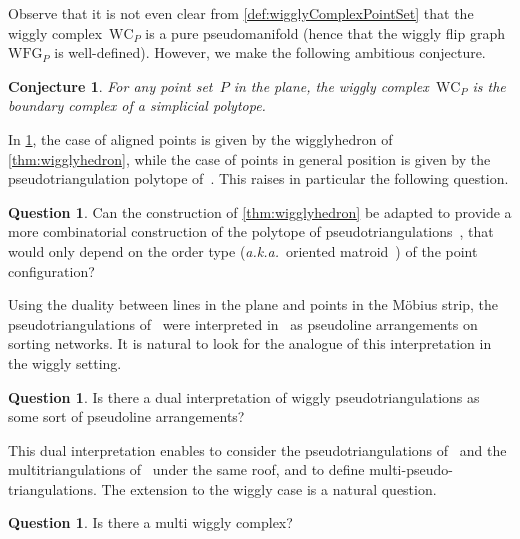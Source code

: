 \documentclass{amsart}
\newtheorem{conjecture}[theorem]{Conjecture}
\theoremstyle{definition}
\newtheorem{question}[theorem]{Question}
\newcommand{\aka}{\textit{a.k.a.}~} %
\newcommand{\wigglyComplex}{\mathrm{WC}} %
\newcommand{\wigglyFlipGraph}{\mathrm{WFG}} %
\begin{document}
Observe that it is not even clear from \cref{def:wigglyComplexPointSet} that the wiggly complex~$\wigglyComplex_P$ is a pure pseudomanifold (hence that the wiggly flip graph~$\wigglyFlipGraph_P$ is well-defined).
However, we make the following ambitious conjecture.

\begin{conjecture}
\label{conj:polytopality}
For any point set~$P$ in the plane, the wiggly complex~$\wigglyComplex_P$ is the boundary complex of a simplicial polytope.
\end{conjecture}

In \cref{conj:polytopality}, the case of aligned points is given by the wigglyhedron of \cref{thm:wigglyhedron}, while the case of points in general position is given by the pseudotriangulation polytope of~\cite{RoteSantosStreinu-polytope}.
This raises in particular the following question.

\begin{question}
Can the construction of \cref{thm:wigglyhedron} be adapted to provide a more combinatorial construction of the polytope of pseudotriangulations~\cite{RoteSantosStreinu-polytope}, that would only depend on the order type (\aka oriented matroid~\cite{BjornerLasVergnasSturmfelsWhiteZiegler}) of the point configuration?
\end{question}

Using the duality between lines in the plane and points in the M\"obius strip, the pseudotriangulations of~\cite{PocchiolaVegter,RoteSantosStreinu-pseudotriangulations} were interpreted in~\cite{PilaudPocchiola} as pseudoline arrangements on sorting networks.
It is natural to look for the analogue of this interpretation in the wiggly setting.

\begin{question}
Is there a dual interpretation of wiggly pseudotriangulations as some sort of pseudoline arrangements? 
\end{question}

This dual interpretation enables \cite{PilaudPocchiola} to consider the pseudotriangulations of~\cite{PocchiolaVegter,RoteSantosStreinu-pseudotriangulations} and the multitriangulations of~\cite{PilaudSantos-multitriangulations} under the same roof, and to define multi-pseudo-triangulations.
The extension to the wiggly case is a natural question.

\begin{question}
Is there a multi wiggly complex?
\end{question}
\end{document}
